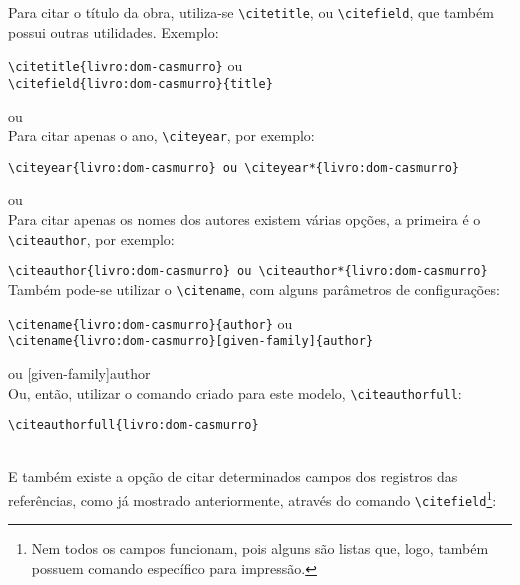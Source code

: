 Para citar o título da obra, utiliza-se \verb|\citetitle|, ou \verb|\citefield|, que também possui outras utilidades. Exemplo: 

\verb|\citetitle{livro:dom-casmurro}| ou \\\verb|\citefield{livro:dom-casmurro}{title}|

 ou \\

Para citar apenas o ano, \verb|\citeyear|, por exemplo: 

\verb|\citeyear{livro:dom-casmurro} ou \citeyear*{livro:dom-casmurro}|

\citeyear{livro:dom-casmurro} ou \citeyear*{livro:dom-casmurro}\\

Para citar apenas os nomes dos autores existem várias opções, a primeira é o \verb|\citeauthor|, por exemplo: 

\verb|\citeauthor{livro:dom-casmurro} ou \citeauthor*{livro:dom-casmurro}|\\

Também pode-se utilizar o \verb|\citename|, com alguns parâmetros de configurações: 

\verb|\citename{livro:dom-casmurro}{author}| ou \\\verb|\citename{livro:dom-casmurro}[given-family]{author}|

 ou [given-family]{author}\\

Ou, então, utilizar o comando criado para este modelo, \verb|\citeauthorfull|\footnotemark:

\verb|\citeauthorfull{livro:dom-casmurro}|

\\

E também existe a opção de citar determinados campos dos registros das referências, como já mostrado anteriormente, através do comando \verb|\citefield|\footnote{Nem todos os campos funcionam, pois alguns são listas que, logo, também possuem comando específico para impressão.}:

